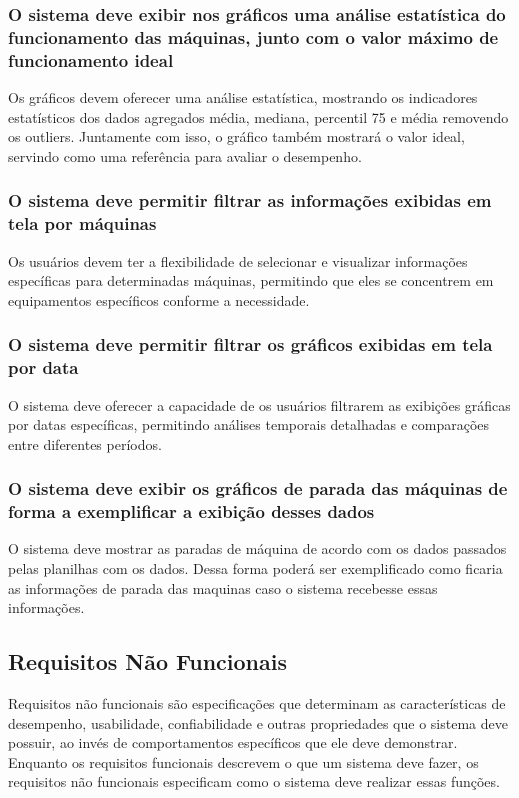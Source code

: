 \subsubsection{O sistema deve exibir nos gráficos uma análise estatística do funcionamento das máquinas, junto com o valor máximo de funcionamento ideal}
Os gráficos devem oferecer uma análise estatística, mostrando os indicadores estatísticos dos dados agregados média, mediana, percentil 75 e média removendo os outliers. Juntamente com isso, o gráfico também mostrará o valor ideal, servindo como uma referência para avaliar o desempenho.

\subsubsection{O sistema deve permitir filtrar as informações exibidas em tela por máquinas}
Os usuários devem ter a flexibilidade de selecionar e visualizar informações específicas para determinadas máquinas, permitindo que eles se concentrem em equipamentos específicos conforme a necessidade.

\subsubsection{O sistema deve permitir filtrar os gráficos exibidas em tela por data}
O sistema deve oferecer a capacidade de os usuários filtrarem as exibições gráficas por datas específicas, permitindo análises temporais detalhadas e comparações entre diferentes períodos.

\subsubsection{O sistema deve exibir os gráficos de parada das máquinas de forma a exemplificar a exibição desses dados}
O sistema deve mostrar as paradas de máquina de acordo com os dados passados pelas planilhas com os dados. Dessa forma poderá ser exemplificado como ficaria as informações de parada das maquinas caso o sistema recebesse essas informações.


\subsection[Requisitos Não Funcionais]{Requisitos Não Funcionais}
Requisitos não funcionais são especificações que determinam as características de desempenho, usabilidade, confiabilidade e outras propriedades que o sistema deve possuir, ao invés de comportamentos específicos que ele deve demonstrar. Enquanto os requisitos funcionais descrevem o que um sistema deve fazer, os requisitos não funcionais especificam como o sistema deve realizar essas funções.

